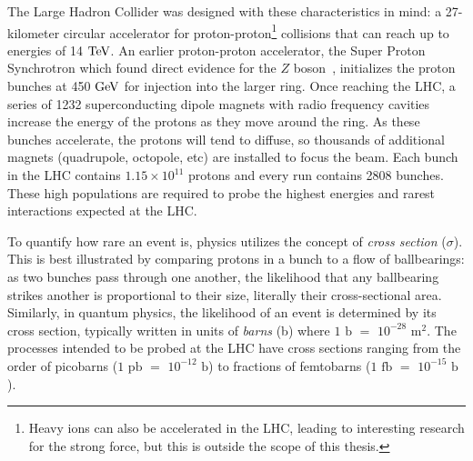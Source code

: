 The Large Hadron Collider was designed with these characteristics in mind: a 27-kilometer circular accelerator for proton-proton\footnote{Heavy ions can also be accelerated in the LHC, leading to interesting research for the strong force, but this is outside the scope of this thesis.} collisions that can reach up to energies of 14 $\rm{TeV}$. An earlier proton-proton accelerator, the Super Proton Synchrotron which found direct evidence for the $Z$ boson~\cite{}, initializes the proton bunches at 450 $\rm{GeV}$ for injection into the larger ring. Once reaching the LHC, a series of 1232 superconducting dipole magnets with radio frequency cavities increase the energy of the protons as they move around the ring. As these bunches accelerate, the protons will tend to diffuse, so thousands of additional magnets (quadrupole, octopole, etc) are installed to focus the beam. Each bunch in the LHC contains $1.15\times10^{11}$ protons and every run contains 2808 bunches. These high populations are required to probe the highest energies and rarest interactions expected at the LHC.

To quantify how rare an event is, physics utilizes the concept of \textit{cross section} ($\sigma$). This is best illustrated by comparing protons in a bunch to a flow of ballbearings: as two bunches pass through one another, the likelihood that any ballbearing strikes another is proportional to their size, literally their cross-sectional area. Similarly, in quantum physics, the likelihood of an event is determined by its cross section, typically written in units of \textit{barns} (b) where $1$ $\mathrm{b}$ $=$ $10^{-28}$ $\mathrm{m}^2$. The processes intended to be probed at the LHC have cross sections ranging from the order of picobarns ($1$ $\mathrm{pb}$ $=$ $10^{-12}$ $\mathrm{b}$) to fractions of femtobarns ($1$ $\mathrm{fb}$ $=$ $10^{-15}$ $\mathrm{b}$).


